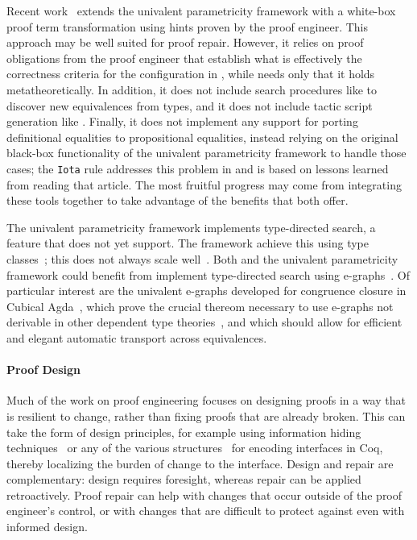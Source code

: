 Recent work~\cite{tabareau2019marriage} extends the univalent parametricity framework with 
a white-box proof term transformation using hints proven by the proof engineer.
This approach may be well suited for proof repair.
However, it relies on proof obligations from the proof engineer that establish what is effectively the correctness criteria
for the configuration in \toolname, while \toolname needs only that it holds metatheoretically.
In addition, it does not include search procedures like \toolname to discover new equivalences from types,
and it does not include tactic script generation like \toolname.
Finally, it does not implement any support for porting definitional equalities to propositional equalities,
instead relying on the original black-box functionality of the univalent parametricity framework to handle those cases;
the \lstinline{Iota} rule addresses this problem in \toolname and is based on lessons learned from reading that article.
The most fruitful progress may come from integrating these tools together to take advantage of the benefits that both offer.

The univalent parametricity framework implements type-directed search, a feature that \toolname does not yet support.
The framework achieve this using type classes~\cite{Sozeau2008}; this does not always scale well~\cite{tabareau2019marriage}.
Both \toolname and the univalent parametricity framework could benefit from implement type-directed search using e-graphs~\cite{egraph1}.
Of particular interest are the univalent e-graphs developed for congruence closure in Cubical Agda~\cite{egraph6},
which prove the crucial thereom necessary to use e-graphs not derivable in other dependent type theories~\cite{egraph7},
and which should allow for efficient and elegant automatic transport across equivalences.

\paragraph{Proof Design}

Much of the work on proof engineering focuses on designing proofs
in a way that is resilient to change, rather than fixing proofs that are already broken.
This can take the form of design principles, for example using 
information hiding techniques~\cite{Woos:2016:PCF:2854065.2854081, Klein:2014:CFV:2584468.2560537}
or any of the various structures~\cite{Chrzaszcz2003, Sozeau2008, Saibi:PhD} for encoding interfaces in Coq,
thereby localizing the burden of change to the interface.
Design and repair are complementary: design requires foresight, whereas repair can be applied retroactively.
Proof repair can help with changes that occur outside of the proof engineer's control,
or with changes that are difficult to protect against even with informed design.

